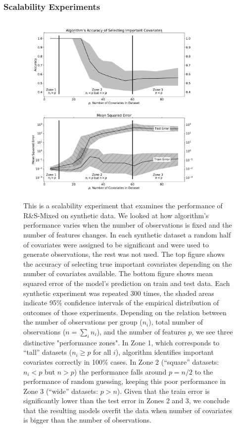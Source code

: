 \documentclass[11pt,letterpaper]{article}
\newcommand{\ouralgo}{R\&S-Mixed }
\numberwithin{equation}{section} %
\numberwithin{figure}{section} %
\numberwithin{table}{section} %
\begin{document}
\subsubsection{Scalability Experiments}
\label{ch:scalability_experiments}
\begin{figure}
	\centering
	\includegraphics[width=0.85\textwidth]{Images/scalability_mse_and_acc}
	\caption{\label{fig:scalability_experiment} This is a scalability experiment that examines the performance of \ouralgo on synthetic data. We looked at how algorithm's performance varies when the number of observations is fixed and the number of features changes. In each synthetic dataset a random half of covariates were assigned to be significant and were used to generate observations, the rest was not used. The top figure shows the accuracy of selecting true important covariates depending on the number of covariates available. The bottom figure shows mean squared error of the model's prediction on train and test data. Each synthetic experiment was repeated 300 times, the shaded areas indicate 95\% confidence intervals of the empirical distribution of outcomes of those experiments. Depending on the relation between the number of observations per group ($n_i$), total number of observations ($n = \sum_i n_i$), and the number of features $p$, we see three distinctive "performance zones". In Zone 1, which corresponds to ``tall'' datasets ($n_i \geq p$ for all $i$), algorithm identifies important covariates correctly in 100\% cases. In Zone 2 (``square'' datasets: $n_i < p$ but $n > p$) the performance falls around $p = n/2$ to the performance of random guessing, keeping this poor performance in Zone 3 (``wide'' datasets: $p > n$). Given that the train error is significantly lower than the test error in Zones 2 and 3, we conclude that the resulting models overfit the data when number of covariates is bigger than the number of observations.}
\end{figure}
\end{document}

